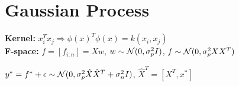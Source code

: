 \begin{comment}
	\pagebreak
\end{comment}

\section{Gaussian Process}
\begin{comment}
	Generalization of Bayesian linear regression. 
	Gaussian Processes are looking at it from the function space, e.g. models distributions over functions directly.\\
	In Bayesian linear regression we modelled the distribution over the weights.\\
\end{comment}

\begin{comment}
\textbf{Introduce non-linearity:} $f(x) = w^T \phi(x) \Rightarrow$ dim. explosion\\
\end{comment}

\textbf{Kernel:} $x_i^T x_j \Rightarrow \phi(x)^T \phi(x) = k(x_i, x_j)$\\

\textbf{F-space:} $f = [f_{i:n}] = Xw$, $w\sim \mathcal{N}(0, \sigma_p^2I)$, $f \sim \mathcal{N}(0, \sigma_p^2 XX^T)$\\
\begin{comment}
	Instead of thinking about Gaussian priors on the weights w (weight-space), we think about gaussian priors on the function values $f=w^Tx$ (function-space).\\
	The linear model then only encodes correlations between the functions through the Kernel, we only need to model how new functions (linearly transformed points) are correlating to the functions we have.\\
	The conversion from weight space to function space happens through linear transformation of the weights, this assumes X to be constant!\\
\end{comment}

$y^* = f^* + \epsilon \sim \mathcal{N}(0, \sigma_p^2 \hat{X}\hat{X}^T + \sigma_n^2 I)$, $\hat{X}^T = [X^T,x^*]$ \\
\begin{comment}
	Data only enters through the inner products, which make kernels very useful.
	The it models how new data correlates with already given data.\\

	\textbf{Intuition:} We place a prior on functions that correlate with our data.
	Functions that agree with our prior and have a high likelihood are more likely, due to bayes: $P(f | data) = P(f) P(data | f)$\\
\end{comment}


